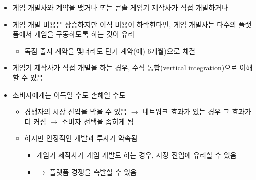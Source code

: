\begin{itemize}
\begin{itemize}
	\item 게임 개발사와 계약을 맺거나 또는 콘솔 게임기 제작사가 직접 개발하거나 
	\item 게임 개발 비용은 상승하지만 이식 비용이 하락한다면, 게임 개발사는 다수의 플랫폼에서 게임을 구동하도록 하는 것이 유리
		\begin{itemize}
		\item 독점 출시 계약을 맺더라도 단기 계약(예) 6개월)으로 체결
		\end{itemize}
	\item 게임기 제작사가 직접 개발을 하는 경우, 수직 통합(vertical integration)으로 이해할 수 있음
	\item 소비자에게는 이득일 수도 손해일 수도
		\begin{itemize}
		\item 경쟁자의 시장 진입을 막을 수 있음 $\rightarrow$ 네트워크 효과가 있는 경우 그 효과가 더 커짐 $\rightarrow$ 소비자 선택을 좁히게 됨
		\item 하지만 안정적인 개발과 투자가 약속됨 
			\begin{itemize}
			\item 게임기 제작사가 게임 개발도 하는 경우, 시장 진입에 유리할 수 있음
			\item $\rightarrow$ 플랫폼 경쟁을 촉발할 수 있음
			\end{itemize}
		\end{itemize}
	\end{itemize}
\end{itemize}

